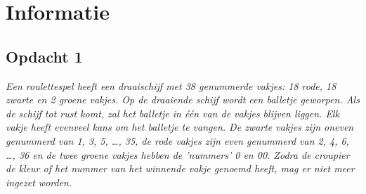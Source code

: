 \chapter{Informatie}

\section{Opdacht 1}
\emph{Een roulettespel heeft een draaischijf met 38 genummerde vakjes: 18 rode, 18 zwarte en 2 groene vakjes. Op de draaiende schijf wordt een balletje geworpen. Als de schijf tot rust komt, zal het balletje in \'{e}\'{e}n van de vakjes blijven liggen. Elk vakje heeft evenveel kans om het balletje te vangen. De zwarte vakjes zijn oneven genummerd van 1, 3, 5, \ldots, 35, de rode vakjes zijn even genummerd van 2, 4, 6, \ldots, 36 en de twee groene vakjes hebben de 'nummers' 0 en 00. Zodra de croupier de kleur of het nummer van het winnende vakje genoemd heeft, mag er niet meer ingezet worden.}
